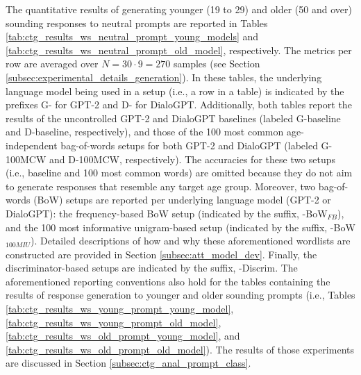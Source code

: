 
The quantitative results of generating younger (19 to 29) and older (50 and over) sounding responses to neutral prompts are reported in Tables \ref{tab:ctg_results_ws_neutral_prompt_young_models} and \ref{tab:ctg_results_ws_neutral_prompt_old_model}, respectively. The metrics per row are averaged over $N = 30 \cdot 9 = 270$ samples (see Section \ref{subsec:experimental_details_generation}). In these tables, the underlying language model being used in a setup (i.e., a row in a table) is indicated by the prefixes G- for GPT-2 and D- for DialoGPT. Additionally, both tables report the results of the uncontrolled GPT-2 and DialoGPT baselines (labeled G-baseline and D-baseline, respectively), and those of the 100 most common age-independent bag-of-words setups for both GPT-2 and DialoGPT (labeled G-100MCW and D-100MCW, respectively). The accuracies for these two setups (i.e., baseline and 100 most common words) are omitted because they do not aim to generate responses that resemble any target age group. Moreover, two bag-of-words (BoW) setups are reported per underlying language model (GPT-2 or DialoGPT): the frequency-based BoW setup (indicated by the suffix, -BoW$_{FB}$), and the 100 most informative unigram-based setup (indicated by the suffix, -BoW$_{100MIU}$). Detailed descriptions of how and why these aforementioned wordlists are constructed are provided in Section \ref{subsec:att_model_dev}. Finally, the discriminator-based setups are indicated by the suffix, -Discrim. The aforementioned reporting conventions also hold for the tables containing the results of response generation to younger and older sounding prompts (i.e., Tables \ref{tab:ctg_results_ws_young_prompt_young_model}, \ref{tab:ctg_results_ws_young_prompt_old_model}, \ref{tab:ctg_results_ws_old_prompt_young_model}, and \ref{tab:ctg_results_ws_old_prompt_old_model}). The results of those experiments are discussed in Section \ref{subsec:ctg_anal_prompt_class}.


